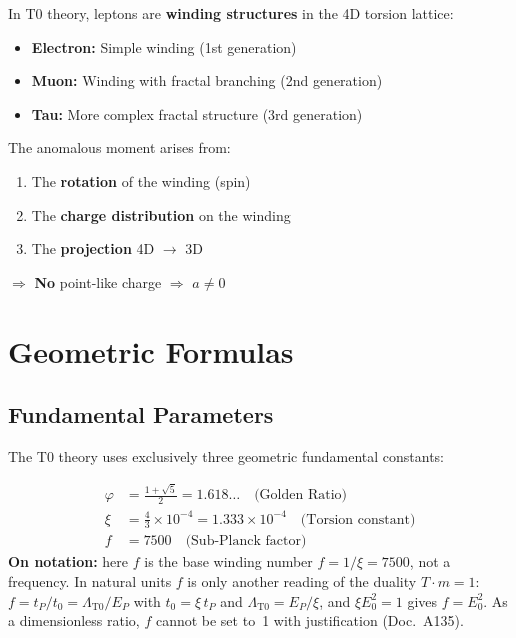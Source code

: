	In T0 theory, leptons are \textbf{winding structures} in the 4D torsion lattice:
	
	\begin{itemize}
		\item \textbf{Electron:} Simple winding (1st generation)
		\item \textbf{Muon:} Winding with fractal branching (2nd generation)
		\item \textbf{Tau:} More complex fractal structure (3rd generation)
	\end{itemize}
	
	The anomalous moment arises from:
	\begin{enumerate}
		\item The \textbf{rotation} of the winding (spin)
		\item The \textbf{charge distribution} on the winding
		\item The \textbf{projection} 4D $\to$ 3D
	\end{enumerate}
	
	$\Rightarrow$ \textbf{No} point-like charge $\Rightarrow$ $a \neq 0$
	
	\section{Geometric Formulas}
	
	\subsection{Fundamental Parameters}
	
	The T0 theory uses exclusively three geometric fundamental constants:
	
	\begin{align}
		\varphi &= \frac{1 + \sqrt{5}}{2} = 1.618\ldots \quad \text{(Golden Ratio)} \\
		\xi &= \frac{4}{3} \times 10^{-4} = 1.333 \times 10^{-4} \quad \text{(Torsion constant)} \\
		f &= 7500 \quad \text{(Sub-Planck factor)}
	\end{align}
	\textbf{On notation:} here $f$ is the base winding number $f = 1/\xi = 7500$, not a frequency. In natural units $f$ is only another reading of the duality $T\cdot m = 1$: $f = t_P/t_0 = \Lambda_{\text{T0}}/E_P$ with $t_0 = \xi\,t_P$ and $\Lambda_{\text{T0}} = E_P/\xi$, and $\xi E_0^2 = 1$ gives $f = E_0^2$. As a dimensionless ratio, $f$ cannot be set to~1 with justification (Doc.~A135).
	
